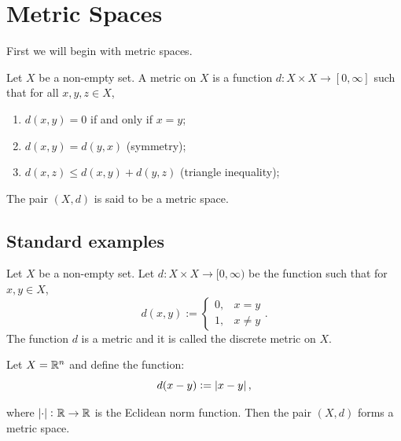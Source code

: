 \documentclass[11pt,a4paper]{article}
\begin{document}
\maketitle
\vspace{5cm}
\begin{center}
\end{center}

\newpage
\tableofcontents
\newpage

\section{Metric Spaces}\label{sec:metric-spaces}
First we will begin with metric spaces.
\begin{definition}
  Let $X$ be a non-empty set. A metric on $X$ is a function 
  $d \colon X \times X \to [0,\infty]$ such that for all $x,y,z \in X$,
  \begin{enumerate}
    \item[(1)] $d(x,y) = 0$ if and only if $x = y$;
    \item[(2)] $d(x,y) = d(y,x)$ (symmetry);
    \item[(3)] $d(x,z) \le d(x,y) + d(y,z)$ (triangle inequality);
  \end{enumerate}
  The pair $(X,d)$ is said to be a metric space.
\end{definition}


\subsection{Standard examples}

\begin{example}
Let $X$ be a non-empty set. Let $d \colon X \times X \to [0,\infty)$ be
the function such that for $x,y \in X$,
\[
  d(x,y) := \begin{cases}
    0, & x=y \\
    1, & x \neq y
  \end{cases}.
\]
The function $d$ is a metric and it is called the discrete metric on $X$.
\end{example}
\begin{example}
Let $X = \mathbb{R}^n$ and define the function:
\[
  d(x - y) := \left\lvert x - y\right\rvert,
\]

where $\left\lvert\cdot\right\rvert \colon \mathbb{R} \to \mathbb{R}$ is the Eclidean norm function. 
Then the pair $(X, d)$ forms a metric space.
\end{example}
\end{document}
